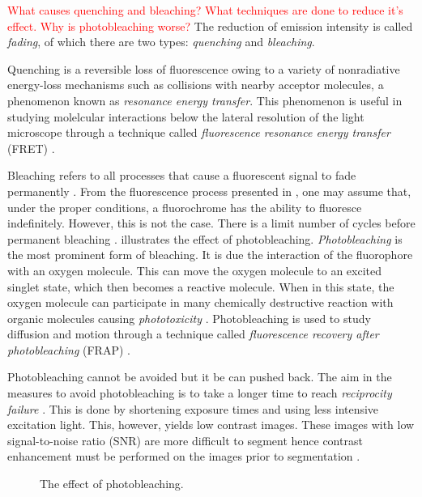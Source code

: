 \begin{definition}[Fading]
	\textcolor{red}{What causes quenching and bleaching? What techniques are done to reduce it's effect. Why is photobleaching worse?}
	The reduction of emission intensity is called \textit{fading}, of which there are two types: \textit{quenching} and \textit{bleaching}.
	
	Quenching is a reversible loss of fluorescence owing to a variety of nonradiative energy-loss mechanisms such as collisions with nearby acceptor molecules, a phenomenon known as \textit{resonance energy transfer}.
	This phenomenon is useful in studying molelcular interactions below the lateral resolution of the light microscope through a technique called \textit{fluorescence resonance energy transfer} (FRET) \cite{Spring2003,Danek2012,LichtmanConchello2005}.
	
	Bleaching refers to all processes that cause a fluorescent signal to fade permanently \citep{LichtmanConchello2005}.
	From the fluorescence process presented in , one may assume that, under the proper conditions, a fluorochrome has the ability to fluoresce indefinitely.
	However, this is not the case. There is a limit number of cycles before permanent bleaching \citep{LichtmanConchello2005}.
	 illustrates the effect of photobleaching.
	\textit{Photobleaching} is the most prominent form of bleaching.
	It is due the interaction of the fluorophore with an oxygen molecule.
	This can move the oxygen molecule to an excited singlet state, which then becomes a reactive molecule.
	When in this state, the oxygen molecule can participate in many chemically destructive reaction with organic molecules causing \textit{phototoxicity} \citep{Danek2012}.
	Photobleaching is used to study diffusion and motion through a technique called \textit{fluorescence recovery after photobleaching} (FRAP) \citep{LichtmanConchello2005,AbramowitzDavidson2016}.
	
	Photobleaching cannot be avoided but it be can pushed back.
	The aim in the measures to avoid photobleaching is to take a longer time to reach \textit{reciprocity failure} \citep{AbramowitzDavidson2016}.
	This is done by shortening exposure times and using less intensive excitation light.
	This, however, yields low contrast images.
	These images with low signal-to-noise \citep{Murphy2001} ratio (SNR) are more difficult to segment hence contrast enhancement must be performed on the images prior to segmentation \citep{Boppart2005}.
	\begin{figure}[!t]
		\centering
		\caption{The effect of photobleaching.}
		\label{fig:bleaching}
	\end{figure}
\end{definition}

